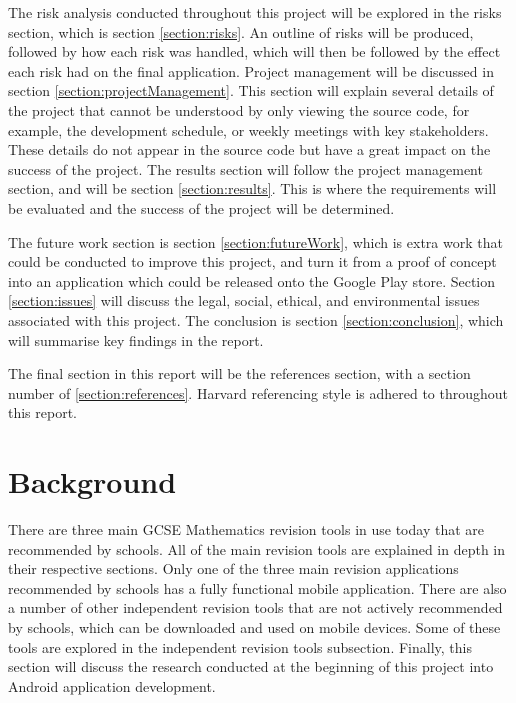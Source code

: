 \documentclass{article}
\begin{document}
The risk analysis conducted throughout this project will be explored in the risks section, which is section \ref{section:risks}. An outline of risks will be produced, followed by how each risk was handled, which will then be followed by the effect each risk had on the final application. Project management will be discussed in section \ref{section:projectManagement}. This section will explain several details of the project that cannot be understood by only viewing the source code, for example, the development schedule, or weekly meetings with key stakeholders. These details do not appear in the source code but have a great impact on the success of the project. The results section will follow the project management section, and will be section \ref{section:results}. This is where the requirements will be evaluated and the success of the project will be determined. \par

The future work section is section \ref{section:futureWork}, which is extra work that could be conducted to improve this project, and turn it from a proof of concept into an application which could be released onto the Google Play store. Section \ref{section:issues} will discuss the legal, social, ethical, and environmental issues associated with this project. The conclusion is section \ref{section:conclusion}, which will summarise key findings in the report. \par

The final section in this report will be the references section, with a section number of \ref{section:references}. Harvard referencing style is adhered to throughout this report.\par

\section{Background}
\label{section:background}

There are three main GCSE Mathematics revision tools in use today that are recommended by schools. All of the main revision tools are explained in depth in their respective sections. Only one of the three main revision applications recommended by schools has a fully functional mobile application. There are also a number of other independent revision tools that are not actively recommended by schools, which can be downloaded and used on mobile devices. Some of these tools are explored in the independent revision tools subsection. Finally, this section will discuss the research conducted at the beginning of this project into Android application development. \par
\end{document}

